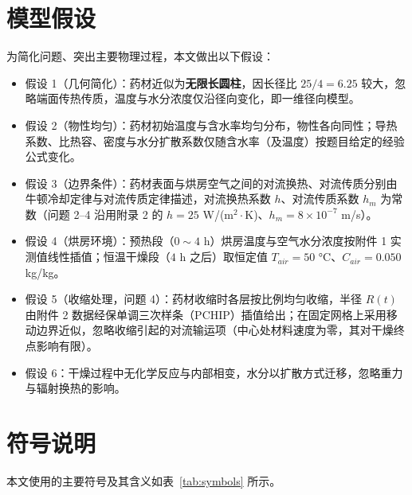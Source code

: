 \section{模型假设}
为简化问题、突出主要物理过程，本文做出以下假设：
\begin{itemize}
	\item 假设 1（几何简化）：药材近似为\textbf{无限长圆柱}，因长径比 $25/4=6.25$ 较大，忽略端面传热传质，温度与水分浓度仅沿径向变化，即一维径向模型。
	\item 假设 2（物性均匀）：药材初始温度与含水率均匀分布，物性各向同性；导热系数、比热容、密度与水分扩散系数仅随含水率（及温度）按题目给定的经验公式变化。
	\item 假设 3（边界条件）：药材表面与烘房空气之间的对流换热、对流传质分别由牛顿冷却定律与对流传质定律描述，对流换热系数 $h$、对流传质系数 $h_m$ 为常数（问题 2--4 沿用附录 2 的 $h=25$ W/(m$^2\cdot$K)、$h_m=8\times10^{-7}$ m/s）。
	\item 假设 4（烘房环境）：预热段（$0\sim4$ h）烘房温度与空气水分浓度按附件 1 实测值线性插值；恒温干燥段（$4$ h 之后）取恒定值 $T_{air}=50$ °C、$C_{air}=0.050$ kg/kg。
	\item 假设 5（收缩处理，问题 4）：药材收缩时各层按比例均匀收缩，半径 $R(t)$ 由附件 2 数据经保单调三次样条（PCHIP）插值给出；在固定网格上采用移动边界近似，忽略收缩引起的对流输运项（中心处材料速度为零，其对干燥终点影响有限）。
	\item 假设 6：干燥过程中无化学反应与内部相变，水分以扩散方式迁移，忽略重力与辐射换热的影响。
\end{itemize}

\section{符号说明}
本文使用的主要符号及其含义如表~\ref{tab:symbols} 所示。

